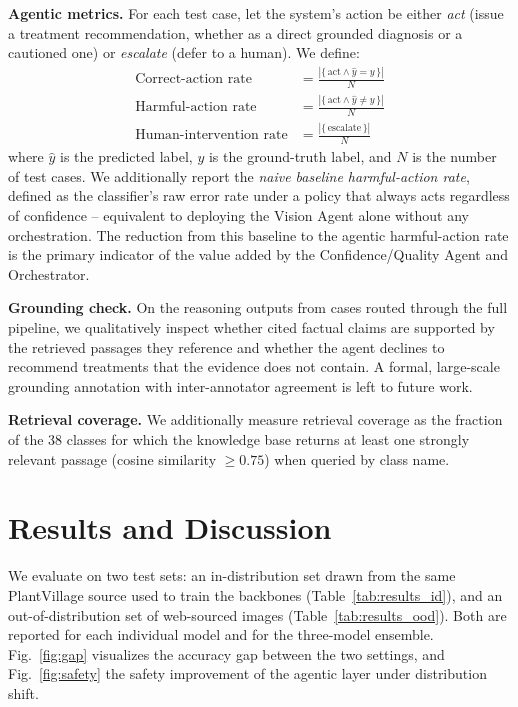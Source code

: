\documentclass[conference]{IEEEtran}
\begin{document}
\textbf{Agentic metrics.} For each test case, let the system's action be either \emph{act} (issue a treatment recommendation, whether as a direct grounded diagnosis or a cautioned one) or \emph{escalate} (defer to a human). We define:
\begin{align}
\text{Correct-action rate} &= \frac{|\{\,\text{act} \wedge \hat{y}=y\,\}|}{N} \\
\text{Harmful-action rate} &= \frac{|\{\,\text{act} \wedge \hat{y}\neq y\,\}|}{N} \\
\text{Human-intervention rate} &= \frac{|\{\,\text{escalate}\,\}|}{N}
\end{align}
where $\hat{y}$ is the predicted label, $y$ is the ground-truth label, and $N$ is the number of test cases. We additionally report the \emph{naive baseline harmful-action rate}, defined as the classifier's raw error rate under a policy that always acts regardless of confidence -- equivalent to deploying the Vision Agent alone without any orchestration. The reduction from this baseline to the agentic harmful-action rate is the primary indicator of the value added by the Confidence/Quality Agent and Orchestrator.

\textbf{Grounding check.} On the reasoning outputs from cases routed through the full pipeline, we qualitatively inspect whether cited factual claims are supported by the retrieved passages they reference and whether the agent declines to recommend treatments that the evidence does not contain. A formal, large-scale grounding annotation with inter-annotator agreement is left to future work.

\textbf{Retrieval coverage.} We additionally measure retrieval coverage as the fraction of the 38 classes for which the knowledge base returns at least one strongly relevant passage (cosine similarity $\geq 0.75$) when queried by class name.

\section{Results and Discussion}
\label{sec:results}

We evaluate on two test sets: an in-distribution set drawn from the same PlantVillage source used to train the backbones (Table~\ref{tab:results_id}), and an out-of-distribution set of web-sourced images (Table~\ref{tab:results_ood}). Both are reported for each individual model and for the three-model ensemble. Fig.~\ref{fig:gap} visualizes the accuracy gap between the two settings, and Fig.~\ref{fig:safety} the safety improvement of the agentic layer under distribution shift.
\end{document}
